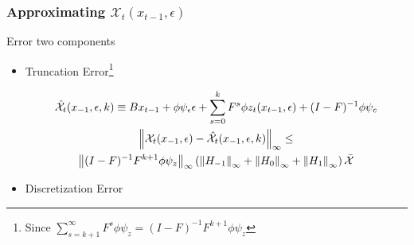 \documentclass[tikz]{beamer}
\begin{document}
\begin{frame}
\frametitle{Approximating $\mathcal{X}_t(x_{t-1},\epsilon)$} 

{\small

Error two components

\begin{itemize}
\item Truncation Error\footnote{Since
$\sum_{s=k+1}^{\infty} F^s \phi \psi_z = (I -F)^{-1} F^{k+1}\phi \psi_z$}

 	 \begin{gather}
 	 \hat{\mathcal{X}}_{t}(x_{-1},\epsilon,k) \equiv B x_{t-1}+ \phi \psi_\epsilon\epsilon + \sum_{s=0}^k F^s \phi z_{t}(x_{t-1},\epsilon) + (I - F)^{-1} \phi \psi_c \label{theTruncSeries}\\
      \label{eq:1}
\left\lVert\mathcal{X}_{t}(x_{-1},\epsilon)-\hat{\mathcal{X}}_{t}(x_{-1},\epsilon,k)\right\rVert_\infty \le\\ \left\lVert(I -F)^{-1} F^{k+1}\phi \psi_z\right\rVert_\infty \left ( \left\lVert H_{-1} \right\rVert_\infty+ \left\lVert H_{0} \right\rVert_\infty+ \left\lVert H_{1} \right\rVert_\infty \right )\bar{\mathcal{X}}
    \end{gather}

\item Discretization Error


\end{itemize}

}
\end{frame}
\end{document}
